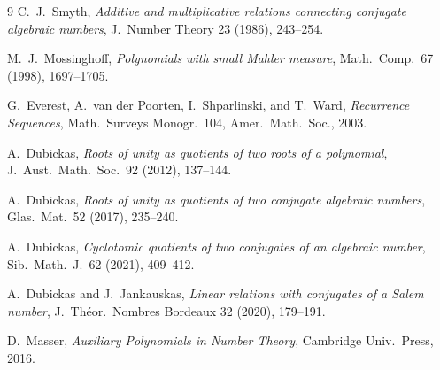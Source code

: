 \documentclass[11pt]{article}
\theoremstyle{plain}
\theoremstyle{definition}
\theoremstyle{remark}
\begin{document}
\begin{thebibliography}{9}
 C.~J.~Smyth, \emph{Additive and multiplicative
relations connecting conjugate algebraic numbers}, J.~Number Theory 23
(1986), 243--254.

 M.~J.~Mossinghoff, \emph{Polynomials with small
Mahler measure}, Math.~Comp.\ 67 (1998), 1697--1705.

 G.~Everest, A.~van der Poorten, I.~Shparlinski, and
T.~Ward, \emph{Recurrence Sequences}, Math.\ Surveys Monogr.\ 104,
Amer.\ Math.\ Soc., 2003.

 A.~Dubickas, \emph{Roots of unity as quotients of two
roots of a polynomial}, J.~Aust.\ Math.\ Soc.\ 92 (2012), 137--144.

 A.~Dubickas, \emph{Roots of unity as quotients of two
conjugate algebraic numbers}, Glas.\ Mat.\ 52 (2017), 235--240.

 A.~Dubickas, \emph{Cyclotomic quotients of two
conjugates of an algebraic number}, Sib.\ Math.\ J.\ 62 (2021), 409--412.

 A.~Dubickas and J.~Jankauskas, \emph{Linear relations
with conjugates of a Salem number}, J.~Th\'eor.\ Nombres Bordeaux 32
(2020), 179--191.

 D.~Masser, \emph{Auxiliary Polynomials in Number Theory},
Cambridge Univ.\ Press, 2016.

\end{thebibliography}
\end{document}
